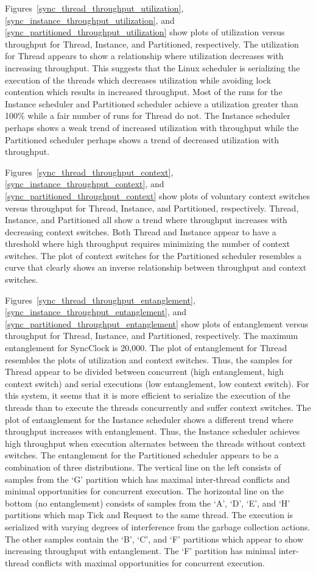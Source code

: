 Figures~\ref{sync_thread_throughput_utilization}, \ref{sync_instance_throughput_utilization}, and \ref{sync_partitioned_throughput_utilization} show plots of utilization versus throughput for Thread, Instance, and Partitioned, respectively.
The utilization for Thread appears to show a relationship where utilization decreases with increasing throughput.
This suggests that the Linux scheduler is serializing the execution of the threads which decreases utilization while avoiding lock contention which results in increased throughput.
Most of the runs for the Instance scheduler and Partitioned scheduler achieve a utilization greater than 100\% while a fair number of runs for Thread do not.
The Instance scheduler perhaps shows a weak trend of increased utilization with throughput while the Partitioned scheduler perhaps shows a trend of decreased utilization with throughput.

Figures~\ref{sync_thread_throughput_context}, \ref{sync_instance_throughput_context}, and \ref{sync_partitioned_throughput_context} show plots of voluntary context switches versus throughput for Thread, Instance, and Partitioned, respectively.
Thread, Instance, and Partitioned all show a trend where throughput increases with decreasing context switches.
Both Thread and Instance appear to have a threshold where high throughput requires minimizing the number of context switches.
The plot of context switches for the Partitioned scheduler resembles a curve that clearly shows an inverse relationship between throughput and context switches.

Figures~\ref{sync_thread_throughput_entanglement}, \ref{sync_instance_throughput_entanglement}, and \ref{sync_partitioned_throughput_entanglement} show plots of entanglement versus throughput for Thread, Instance, and Partitioned, respectively.
The maximum entanglement for SyncClock is 20,000.
The plot of entanglement for Thread resembles the plots of utilization and context switches.
Thus, the samples for Thread appear to be divided between concurrent (high entanglement, high context switch) and serial executions (low entanglement, low context switch).
For this system, it seems that it is more efficient to serialize the execution of the threads than to execute the threads concurrently and suffer context switches.
The plot of entanglement for the Instance scheduler shows a different trend where throughput increases with entanglement.
Thus, the Instance scheduler achieves high throughput when execution alternates between the threads without context switches.
The entanglement for the Partitioned scheduler appears to be a combination of three distributions.
The vertical line on the left consists of samples from the `G' partition which has maximal inter-thread conflicts and minimal opportunities for concurrent execution.
The horizontal line on the bottom (no entanglement) consists of samples from the `A', `D', `E', and `H' partitions which map Tick and Request to the same thread.
The execution is serialized with varying degrees of interference from the garbage collection actions.
The other samples contain the `B', `C', and `F' partitions which appear to show increasing throughput with entanglement.
The `F' partition has minimal inter-thread conflicts with maximal opportunities for concurrent execution.

